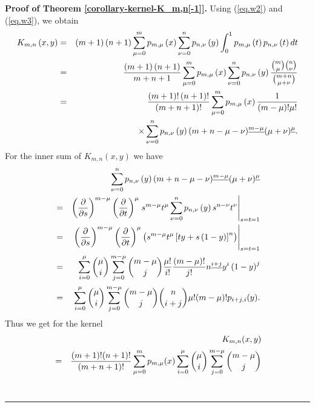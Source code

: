 \documentclass[12pt,reqno]{article}
\newenvironment{proof}[1][Proof]{\noindent\textbf{#1.} }{\ \rule{0.5em}{0.5em}}
\begin{document}
\begin{proof}[{Proof of Theorem \protect\ref{corollary-kernel-K_m,n[-1]}}]
Using (\ref{eq.w2}) and (\ref{eq.w3}), we obtain 
\begin{eqnarray*}
K_{m,n}\left( x,y\right) &=&\left( m+1\right) \left( n+1\right) \sum_{\mu
=0}^{m}p_{m,\mu }\left( x\right) \sum_{\nu =0}^{n}p_{n,\nu }\left( y\right)
\int_{0}^{1}p_{m,\mu }\left( t\right) p_{n,\nu }\left( t\right) dt \\
&=&\frac{\left( m+1\right) \left( n+1\right) }{m+n+1}\sum_{\mu
=0}^{m}p_{m,\mu }\left( x\right) \sum_{\nu =0}^{n}p_{n,\nu }\left( y\right) 
\frac{\binom{m}{\mu }\binom{n}{\nu }}{\binom{m+n}{\mu +\nu }} \\
&=&\frac{\left( m+1\right) !\left( n+1\right) !}{\left( m+n+1\right) !}%
\sum_{\mu =0}^{m}p_{m,\mu }\left( x\right) \dfrac{1}{(m-\mu )!\mu !} \\
&&\times \sum_{\nu =0}^{n}p_{n,\nu }\left( y\right) (m+n-\mu -\nu )^{%
\underline{m-\mu }}(\mu +\nu )^{\underline{\mu }}.
\end{eqnarray*}%
For the inner sum of $K_{m,n}\left( x,y\right) $ we have 
\begin{eqnarray}
&&\sum_{\nu =0}^{n}p_{n,\nu }\left( y\right) (m+n-\mu -\nu )^{\underline{%
m-\mu }}(\mu +\nu )^{\underline{\mu }}  \label{eq.ww1} \\
&=&\left( \frac{\partial }{\partial s}\right) ^{m-\mu }\left( \frac{\partial 
}{\partial t}\right) ^{\mu }\left. s^{m-\mu }t^{\mu }\sum_{\nu
=0}^{n}p_{n,\nu }\left( y\right) s^{n-\nu }t^{\nu }\right \vert _{s=t=1} 
\notag \\
&=&\left. \left( \frac{\partial }{\partial s}\right) ^{m-\mu }\left( \frac{%
\partial }{\partial t}\right) ^{\mu }\left( s^{m-\mu }t^{\mu }\left[
ty+s\left( 1-y\right) \right] ^{n}\right) \right \vert _{s=t=1}  \notag \\
&=&\sum_{i=0}^{\mu }\binom{\mu }{i}\sum_{j=0}^{m-\mu }\binom{m-\mu }{j}\frac{%
\mu !}{i!}\frac{\left( m-\mu \right) !}{j!}
n^{\underline{i+j}}   %
y^{i}\left( 1-y\right) ^{j}  \notag \\
&=&\displaystyle \sum_{i=0}^{\mu }{\binom{\mu }{i}}\sum_{j=0}^{m-\mu }{%
\binom{m-\mu }{j}}{\binom{n}{i+j}}\mu !(m-\mu )!p_{i+j,i}(y).  \notag
\end{eqnarray}%
Thus we get for the kernel 
\begin{eqnarray*}
&&K_{m,n}(x,y) \\
&=&\frac{(m+1)!(n+1)!}{(m+n+1)!}\sum_{\mu =0}^{m}p_{m,\mu
}(x)\sum_{i=0}^{\mu }{\binom{\mu }{i}}\sum_{j=0}^{m-\mu }{\binom{m-\mu }{j}}{%
}
\end{eqnarray*}
\end{proof}
\end{document}

